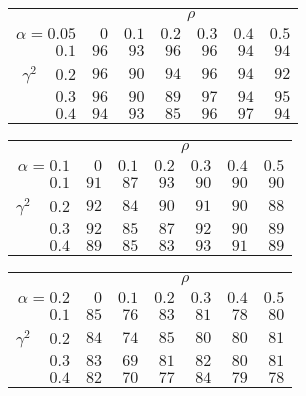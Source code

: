 \begin{tabular}{r|rrrrrr}
\hline\hline
 &\multicolumn{6}{c}{$\rho$} \\ 
 $\alpha = 0.05$ & $0$ & $0.1$ & $0.2$ & $0.3$ & $0.4$ & $0.5$ \\ 
 \hline$0.1$ & $96$ & $93$ & $96$ & $96$ & $94$ & $94$\\ 
$\gamma^2\;\;\;$ $0.2$ & $96$ & $90$ & $94$ & $96$ & $94$ & $92$\\ 
$0.3$ & $96$ & $90$ & $89$ & $97$ & $94$ & $95$\\ 
$0.4$ & $94$ & $93$ & $85$ & $96$ & $97$ & $94$\\ 
 \hline 
 \end{tabular}
 
 \vspace{2em} 
 
\begin{tabular}{r|rrrrrr}
\hline\hline
 &\multicolumn{6}{c}{$\rho$} \\ 
 $\alpha = 0.1$ & $0$ & $0.1$ & $0.2$ & $0.3$ & $0.4$ & $0.5$ \\ 
 \hline$0.1$ & $91$ & $87$ & $93$ & $90$ & $90$ & $90$\\ 
$\gamma^2\;\;\;$ $0.2$ & $92$ & $84$ & $90$ & $91$ & $90$ & $88$\\ 
$0.3$ & $92$ & $85$ & $87$ & $92$ & $90$ & $89$\\ 
$0.4$ & $89$ & $85$ & $83$ & $93$ & $91$ & $89$\\ 
 \hline 
 \end{tabular}
 
 \vspace{2em} 
 
\begin{tabular}{r|rrrrrr}
\hline\hline
 &\multicolumn{6}{c}{$\rho$} \\ 
 $\alpha = 0.2$ & $0$ & $0.1$ & $0.2$ & $0.3$ & $0.4$ & $0.5$ \\ 
 \hline$0.1$ & $85$ & $76$ & $83$ & $81$ & $78$ & $80$\\ 
$\gamma^2\;\;\;$ $0.2$ & $84$ & $74$ & $85$ & $80$ & $80$ & $81$\\ 
$0.3$ & $83$ & $69$ & $81$ & $82$ & $80$ & $81$\\ 
$0.4$ & $82$ & $70$ & $77$ & $84$ & $79$ & $78$\\ 
 \hline 
 \end{tabular}